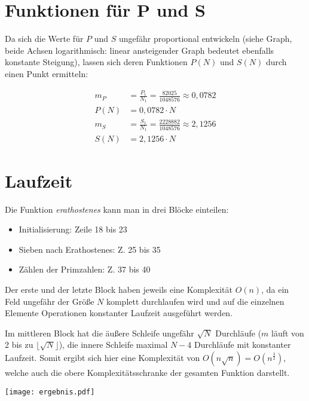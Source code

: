 \documentclass[a4paper,11pt]{scrartcl}
\date{03.05.2015}
\author{Benedikt Geißler}
\begin{document}
\section*{Funktionen für P und S}

Da sich die Werte für $P$ und $S$ ungefähr proportional entwickeln (siehe 
Graph, beide Achsen logarithmisch: linear ansteigender Graph bedeutet 
ebenfalls konstante Steigung), lassen 
sich deren Funktionen $P(N)$ und $S(N)$ durch einen Punkt ermitteln:

\begin{align*}
  m_P &= \frac{P_1}{N_1} = \frac{82025}{1048576} \approx 0,0782 \\
  P(N) &= 0,0782 \cdot N \\
  m_S &= \frac{S_1}{N_1} = \frac{2228882}{1048576} \approx 2,1256 \\
  S(N) &= 2,1256 \cdot N
\end{align*}

\section*{Laufzeit}
Die Funktion \emph{erathostenes} kann man in drei Blöcke einteilen:

\begin{itemize}
  \item Initialisierung: Zeile 18 bis 23
  \item Sieben nach Erathostenes: Z. 25 bis 35
  \item Zählen der Primzahlen: Z. 37 bis 40
\end{itemize}

Der erste und der letzte Block haben jeweils eine  Komplexität $O(n)$, da ein 
Feld ungefähr der Größe $N$ komplett durchlaufen wird und auf die einzelnen 
Elemente Operationen konstanter Laufzeit ausgeführt werden.

Im mittleren Block hat die äußere Schleife ungefähr $\sqrt{N}$ Durchläufe 
($m$ läuft von 2 bis zu $\lfloor\sqrt{N}\rfloor$), die innere Schleife 
maximal $N - 4$ Durchläufe mit konstanter Laufzeit. Somit ergibt sich hier 
eine Komplexität von $O(n\sqrt{n}) = O(n^{\frac{3}{2}})$, welche auch die 
obere Komplexitätsschranke der gesamten Funktion darstellt.

\texttt{[image: ergebnis.pdf]}
\end{document}
